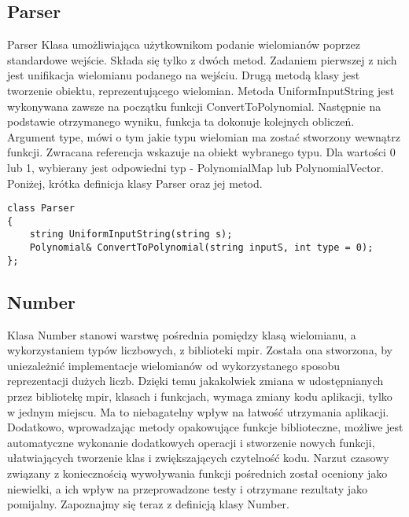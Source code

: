 \documentclass[twoside,a4paper]{book}
\begin{document}
\subsection{Parser}
Parser
Klasa umożliwiająca użytkownikom podanie wielomianów poprzez standardowe wejście. Składa się tylko z dwóch metod. Zadaniem pierwszej z nich jest unifikacja wielomianu podanego na wejściu. Drugą metodą klasy jest tworzenie obiektu, reprezentującego wielomian. Metoda UniformInputString jest wykonywana zawsze na początku funkcji ConvertToPolynomial. Następnie na podstawie otrzymanego wyniku, funkcja ta dokonuje kolejnych obliczeń. Argument type, mówi o tym jakie typu wielomian ma zostać stworzony wewnątrz funkcji. Zwracana referencja wskazuje na obiekt wybranego typu. Dla wartości 0 lub 1, wybierany jest odpowiedni typ - PolynomialMap lub PolynomialVector. Poniżej, krótka definicja klasy Parser oraz jej metod.

\begin{lstlisting}
class Parser
{
	string UniformInputString(string s);
	Polynomial& ConvertToPolynomial(string inputS, int type = 0);
};
\end{lstlisting}

\subsection{Number}
Klasa Number stanowi warstwę pośrednia pomiędzy klasą wielomianu, a wykorzystaniem typów liczbowych, z biblioteki mpir. Została ona stworzona, by uniezależnić implementacje wielomianów od wykorzystanego sposobu reprezentacji dużych liczb. Dzięki temu jakakolwiek zmiana w udostępnianych przez bibliotekę mpir, klasach i funkcjach, wymaga zmiany kodu aplikacji, tylko w jednym miejscu. Ma to niebagatelny wpływ na łatwość utrzymania aplikacji. Dodatkowo, wprowadzając metody opakowujące funkcje biblioteczne, możliwe jest automatyczne wykonanie dodatkowych operacji i stworzenie nowych funkcji, ułatwiających tworzenie klas i zwiększających czytelność kodu. Narzut czasowy związany z koniecznością wywoływania funkcji pośrednich został oceniony jako niewielki, a ich wpływ na przeprowadzone testy i otrzymane rezultaty jako pomijalny. Zapoznajmy się teraz z definicją klasy Number.
\end{document}
